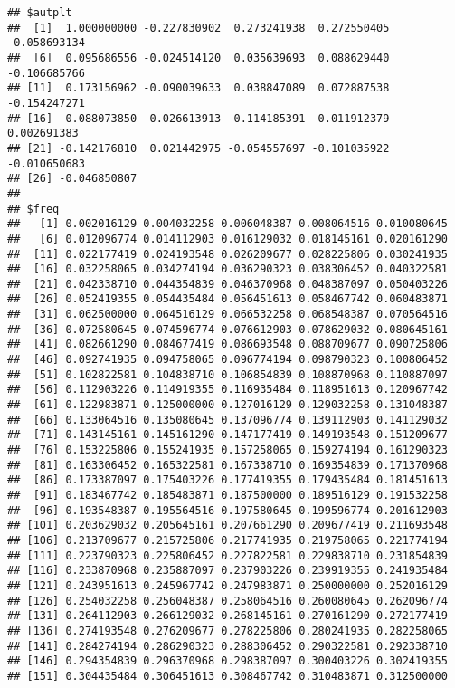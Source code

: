 \documentclass[]{article}
\begin{document}
\begin{verbatim}
## $autplt
##  [1]  1.000000000 -0.227830902  0.273241938  0.272550405 -0.058693134
##  [6]  0.095686556 -0.024514120  0.035639693  0.088629440 -0.106685766
## [11]  0.173156962 -0.090039633  0.038847089  0.072887538 -0.154247271
## [16]  0.088073850 -0.026613913 -0.114185391  0.011912379  0.002691383
## [21] -0.142176810  0.021442975 -0.054557697 -0.101035922 -0.010650683
## [26] -0.046850807
## 
## $freq
##   [1] 0.002016129 0.004032258 0.006048387 0.008064516 0.010080645
##   [6] 0.012096774 0.014112903 0.016129032 0.018145161 0.020161290
##  [11] 0.022177419 0.024193548 0.026209677 0.028225806 0.030241935
##  [16] 0.032258065 0.034274194 0.036290323 0.038306452 0.040322581
##  [21] 0.042338710 0.044354839 0.046370968 0.048387097 0.050403226
##  [26] 0.052419355 0.054435484 0.056451613 0.058467742 0.060483871
##  [31] 0.062500000 0.064516129 0.066532258 0.068548387 0.070564516
##  [36] 0.072580645 0.074596774 0.076612903 0.078629032 0.080645161
##  [41] 0.082661290 0.084677419 0.086693548 0.088709677 0.090725806
##  [46] 0.092741935 0.094758065 0.096774194 0.098790323 0.100806452
##  [51] 0.102822581 0.104838710 0.106854839 0.108870968 0.110887097
##  [56] 0.112903226 0.114919355 0.116935484 0.118951613 0.120967742
##  [61] 0.122983871 0.125000000 0.127016129 0.129032258 0.131048387
##  [66] 0.133064516 0.135080645 0.137096774 0.139112903 0.141129032
##  [71] 0.143145161 0.145161290 0.147177419 0.149193548 0.151209677
##  [76] 0.153225806 0.155241935 0.157258065 0.159274194 0.161290323
##  [81] 0.163306452 0.165322581 0.167338710 0.169354839 0.171370968
##  [86] 0.173387097 0.175403226 0.177419355 0.179435484 0.181451613
##  [91] 0.183467742 0.185483871 0.187500000 0.189516129 0.191532258
##  [96] 0.193548387 0.195564516 0.197580645 0.199596774 0.201612903
## [101] 0.203629032 0.205645161 0.207661290 0.209677419 0.211693548
## [106] 0.213709677 0.215725806 0.217741935 0.219758065 0.221774194
## [111] 0.223790323 0.225806452 0.227822581 0.229838710 0.231854839
## [116] 0.233870968 0.235887097 0.237903226 0.239919355 0.241935484
## [121] 0.243951613 0.245967742 0.247983871 0.250000000 0.252016129
## [126] 0.254032258 0.256048387 0.258064516 0.260080645 0.262096774
## [131] 0.264112903 0.266129032 0.268145161 0.270161290 0.272177419
## [136] 0.274193548 0.276209677 0.278225806 0.280241935 0.282258065
## [141] 0.284274194 0.286290323 0.288306452 0.290322581 0.292338710
## [146] 0.294354839 0.296370968 0.298387097 0.300403226 0.302419355
## [151] 0.304435484 0.306451613 0.308467742 0.310483871 0.312500000

\end{verbatim}
\end{document}

